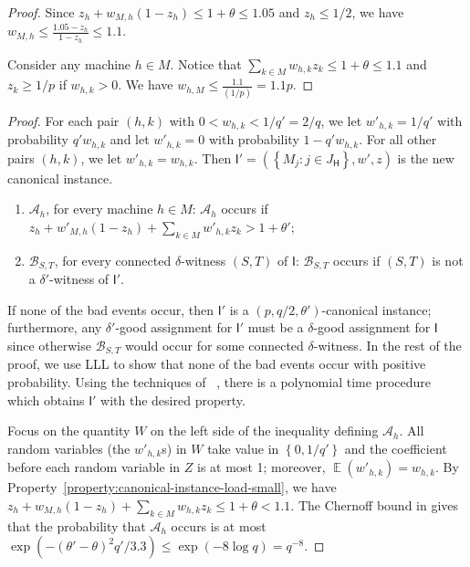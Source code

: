 \documentclass[11pt]{article}
\newcounter{prop}
\newcommand{\set}[1]{\left\{#1\right\}}
\DeclareMathOperator{\E}{\mathbb E}
\newcommand{\calA}{{\mathscr A}}
\newcommand{\calB}{{\mathscr B}}
\newcommand{\cB}{\mathscr{B}}
\newcommand{\cI}{{\mathsf I}}
\newcommand{\sfH}{{\mathsf H}}
\begin{document}
\begin{proof}
Since $z_h + {w_{M,h}}(1-z_h) \leq 1 + \theta \leq 1.05$ and $z_h \leq 1/2$, we have $w_{M,h} \leq \frac{1.05-z_h}{1-z_h} \leq 1.1$.  

Consider any machine $h \in M$. Notice that $\sum_{k\in M} w_{h,k} z_{k} \leq  1 + \theta \leq 1.1$ and $z_{k} \geq 1/p$ if $w_{h,k} > 0$. We have $w_{h,M} \leq \frac{1.1}{(1/p)} = 1.1p$.
\end{proof}

\reduceq*
\begin{proof}


For each pair $(h, k)$ with $0 < w_{h, k} < 1/q' = 2/q$, we let $w'_{h,k} = 1/q'$ with probability $q'w_{h,k}$ and let $w'_{h,k} = 0$ with probability $1-q'w_{h,k}$.  For all other pairs $(h,k)$, we let $w'_{h,k} = w_{h,k}$. Then $\cI' = (\set{M_j:j\in J_\sfH}, w', z)$ is the new canonical instance. 
\begin{enumerate}
\item ${\calA}_h$, for every machine $h \in M$:  ${\calA}_h$ occurs if $z_h+w'_{M,h}(1-z_h) + \sum_{k \in M}w'_{h,k}z_{k} > 1 + \theta'$;
\item ${\calB}_{S, T}$, for every connected $\delta$-witness $(S, T)$ of $\cI$: ${\calB}_{S, T}$ occurs if $(S, T)$ is not a $\delta'$-witness of $\cI'$.
\end{enumerate}

If none of the bad events occur, then $\cI'$ is a $(p,q/2,\theta')$-canonical instance; furthermore, any $\delta'$-good assignment for $\cI'$ must be a $\delta$-good assignment for $\cI$ since
otherwise $\cB_{S,T}$ would occur for some connected $\delta$-witness.
In the rest of the proof, we use LLL to show that none of the bad events occur with positive probability. Using the techniques of ~\cite{MT10,HSS11}, there is a polynomial time procedure which obtains $\cI'$ with the desired property. 

Focus on the quantity $W$ on the left side of the inequality defining $\calA_h$.  All random variables (the $w'_{h,k}$s) in $W$ take value in $\set{0, 1/q'}$ and the coefficient before each random variable in $Z$ is at most 1; moreover, $\E(w'_{h,k}) = w_{h,k}$.
By Property~\ref{property:canonical-instance-load-small}, we have $z_h + {w_{M,h}}(1-z_h) + \sum_{k \in M}w_{h,k}z_{k} \leq 1+\theta < 1.1$.    The Chernoff bound in  gives that the probability that ${\calA}_h$ occurs is at most $\exp\left(-(\theta' - \theta)^2q'/3.3\right)\leq \exp(-8\log q) = q^{-8}$.  


\end{proof}
\end{document}
